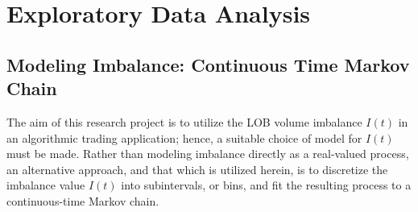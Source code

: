 \chapter{Exploratory Data Analysis}

\section{Modeling Imbalance: Continuous Time Markov Chain}
The aim of this research project is to utilize the LOB volume imbalance $I(t)$ in an algorithmic trading application; hence, a suitable choice of model for $I(t)$ must be made. Rather than modeling imbalance directly as a real-valued process, an alternative approach, and that which is utilized herein, is to discretize the imbalance value $I(t)$ into subintervals, or bins, and fit the resulting process to a continuous-time Markov chain.

